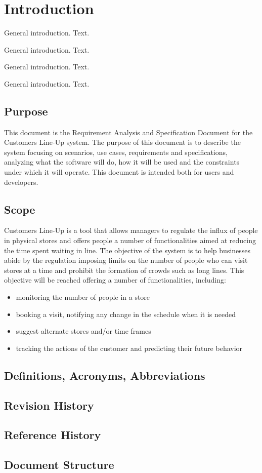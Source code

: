 \section{Introduction}\label{sec:intro}

General introduction. Text.

General introduction. Text.

General introduction. Text.

General introduction. Text.
\subsection{Purpose}
This document is the Requirement Analysis and Specification Document for the Customers Line-Up system.
The purpose of this document is to describe the system focusing on scenarios, use cases, requirements and specifications,
analyzing what the software will do, how it will be used and the constraints under which it will operate.
This document is intended both for users and developers.

\subsection{Scope}
Customers Line-Up is a tool that allows managers to regulate the influx of people in physical stores and offers
people a number of functionalities aimed at reducing the time spent waiting in line.
The objective of the system is to help businesses abide by the regulation imposing limits on the number of people
who can visit stores at a time and prohibit the formation of crowds such as long lines.
This objective will be reached offering a number of functionalities, including:
\begin{itemize}
    \item monitoring the number of people in a store
    \item booking a visit, notifying any change in the schedule when it is needed
    \item suggest alternate stores and/or time frames
    \item tracking the actions of the customer and predicting their future behavior
\end{itemize}

\subsection{Definitions, Acronyms, Abbreviations}
\subsection{Revision History}
\subsection{Reference History}
\subsection{Document Structure}